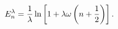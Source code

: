 \begin{equation}
E^\lambda_n = {1\over\lambda}\ln \left[ 1+\lambda\omega\left(n+{1\over 2}\right) \right].
\end{equation}

